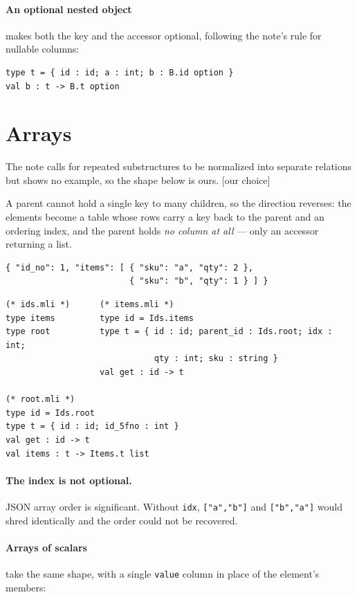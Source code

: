 \documentclass[11pt,a4paper]{article}
\newcommand{\ourcall}{\textcolor{ours}{\textsf{[our choice]}}}
\begin{document}
\paragraph{An optional nested object} makes both the key and the accessor
optional, following the note's rule for nullable columns:

\begin{lstlisting}[style=ml]
type t = { id : id; a : int; b : B.id option }
val b : t -> B.t option
\end{lstlisting}

\section{Arrays}\label{sec:arrays}

The note calls for repeated substructures to be normalized into separate
relations but shows no example, so the shape below is ours. \ourcall{}

A parent cannot hold a single key to many children, so the direction reverses:
the elements become a table whose rows carry a key back to the parent and an
ordering index, and the parent holds \emph{no column at all} --- only an
accessor returning a list.

\begin{lstlisting}[style=json]
{ "id_no": 1, "items": [ { "sku": "a", "qty": 2 },
                         { "sku": "b", "qty": 1 } ] }
\end{lstlisting}

\begin{lstlisting}[style=ml]
(* ids.mli *)      (* items.mli *)
type items         type id = Ids.items
type root          type t = { id : id; parent_id : Ids.root; idx : int;
                              qty : int; sku : string }
                   val get : id -> t

(* root.mli *)
type id = Ids.root
type t = { id : id; id_5fno : int }
val get : id -> t
val items : t -> Items.t list
\end{lstlisting}

\paragraph{The index is not optional.} JSON array order is significant.
Without \texttt{idx}, \texttt{["a","b"]} and \texttt{["b","a"]} would shred
identically and the order could not be recovered.

\paragraph{Arrays of scalars} take the same shape, with a single
\texttt{value} column in place of the element's members:
\end{document}
